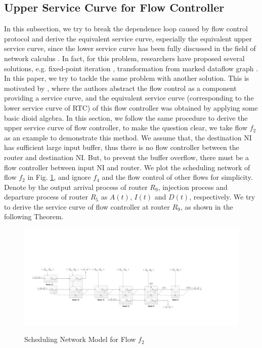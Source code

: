 \documentclass[10pt,journal]{IEEEtran}
\begin{document}
\subsection{Upper Service Curve for Flow Controller}\label{flowcontrol}
In this subsection, we try to break the dependence loop caused by flow control protocol and derive the equivalent service curve, especially the equivalent upper service curve, since the lower service curve has been fully discussed in the field of network calculus \cite{Boudec2001Network}. In fact, for this problem, researchers have proposed several solutions, e.g. fixed-point iteration \cite{schioler2005network}\cite{Jonsson:2008:CDM:1450058.1450083}, transformation from marked dataflow graph \cite{Thiele:2009:MPA:1629335.1629353}. In this paper, we try to tackle the same problem with another solution. This is motivated by \cite{QLDD09FC}, where the authors abstract the flow control as a component providing a service curve, and the equivalent service curve (corresponding to the lower service curve of RTC) of this flow controller was obtained by applying some basic dioid algebra. In this section, we follow the same procedure to derive the upper service curve of flow controller, to make the question clear, we take flow $f_2$ as an example to demonstrate this method. We assume that, the destination NI has sufficient large input buffer, thus there is no flow controller between the router and destination NI. But, to prevent the buffer overflow, there must be a flow controller between input NI and router. We plot the scheduling network of flow $f_2$ in Fig. \ref{f2}, and ignore $f_4$ and the flow control of other flows for simplicity. Denote by the output arrival process of router $R_9$, injection process and departure process of router $R_{5}$ as $A(t)$, $I(t)$ and $D(t)$, respectively. We try to derive the service curve of flow controller at router $R_9$, as shown in the following Theorem.
\begin{figure}
  \centering
  \includegraphics[scale=0.35]{figures/f2.pdf}\\
  \caption{Scheduling Network Model for Flow $f_2$}\label{f2}
\end{figure}
\end{document}
